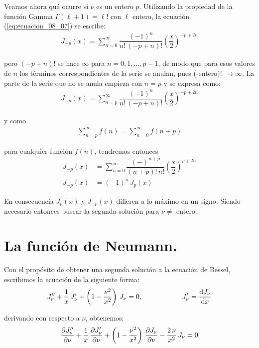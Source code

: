 Veamos ahora qué ocurre si $\nu$ es un entero $p$. Utilizando la propiedad de la función Gamma $\Gamma (\ell + 1) = \ell !$ con $\ell$ entero, la ecuación (\ref{eq:ecuacion_08_07}) se escribe:
\begin{align*}
J_{-p} (x) = \sum_{n=0}^{\infty} \dfrac{(-1)^{n}}{n! \, (-p + n)!} \left( \dfrac{x}{2} \right)^{-p+2n}
\end{align*}

pero $(-p + n)!$ se hace $\infty$ para $n = 0, 1, \ldots, p-1$, de modo que para esos valores de $n$ los términos correspondientes de la serie se anulan, pues (-entero)! $\to \infty$. La parte de la serie que no se anula empieza con $n = p$ y se expresa como:
\begin{align*}
J_{-p} (x) = \sum_{n=p}^{\infty} \dfrac{(-1)^{n}}{n! \, (-p + n)!} \left( \dfrac{x}{2} \right)^{-p+2n}
\end{align*}

y como 
\begin{align*}
\sum_{n=p}^{\infty} f(n) = \sum_{n=0}^{\infty} f(n + p)
\end{align*}

para cualquier función $f(n)$, tendremos entonces
\begin{align*}
J_{-p} (x) &= \sum_{n=0}^{\infty} \dfrac{(-)^{n+p}}{(n + p)! \, n!} \left( \dfrac{x}{2} \right)^{p+2n} \\[0.5em]
J_{-p} (x) &= (-1)^{n} \, J_{p}(x)
\end{align*}

En consecuencia $J_{p}(x)$ y $J_{-p}(x)$ difieren a lo máximo en un signo. Siendo necesario entonces buscar la segunda solución para $\nu \neq$ entero.

\section{La función de Neumann.}

Con el propósito de obtener una segunda solución a la ecuación de Bessel, escribimos la ecuación de la siguiente forma:
\begin{align*}
{J}^{\prime \prime}_{\nu} + \dfrac{1}{x} \, {J}^{\prime}_{\nu}  + \left( 1 - \dfrac{\nu^{2}}{x^{2}} \right) \, J_{\nu} = 0, \hspace{2cm} {J}^{\prime}_{\nu} = \dv{J_{\nu}}{x}
\end{align*}

derivando con respecto a $\nu$, obtenemos:
\begin{align}
\pdv{\ensuremath{{J}^{\prime \prime}}_{\nu}}{\nu} + \dfrac{1}{x} \, \pdv{\ensuremath{{J}^{\prime}}_{\nu}}{\nu} + \left( 1 - \dfrac{\nu^{2}}{x^{2}} \right) \, \pdv{J_{\nu}}{\nu} - \dfrac{2 \, \nu}{x^{2}} \, J_{\nu} = 0
\label{eq:ecuacion_08_08} 
\end{align}

